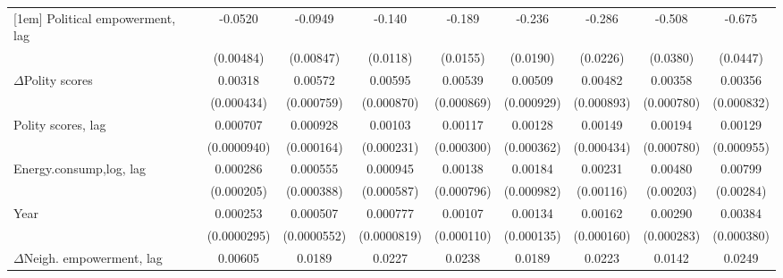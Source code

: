 \begin{table}[htbp]
\begin{tabular}{l*{8}{c}}
[1em]
Political empowerment, lag   &     -0.0520\sym{***}&     -0.0949\sym{***}&      -0.140\sym{***}&      -0.189\sym{***}&      -0.236\sym{***}&      -0.286\sym{***}&      -0.508\sym{***}&      -0.675\sym{***}\\
                    &   (0.00484)         &   (0.00847)         &    (0.0118)         &    (0.0155)         &    (0.0190)         &    (0.0226)         &    (0.0380)         &    (0.0447)         \\
[1em]
$\Delta$Polity scores            &     0.00318\sym{***}&     0.00572\sym{***}&     0.00595\sym{***}&     0.00539\sym{***}&     0.00509\sym{***}&     0.00482\sym{***}&     0.00358\sym{***}&     0.00356\sym{***}\\
                    &  (0.000434)         &  (0.000759)         &  (0.000870)         &  (0.000869)         &  (0.000929)         &  (0.000893)         &  (0.000780)         &  (0.000832)         \\
[1em]
Polity scores, lag            &    0.000707\sym{***}&    0.000928\sym{***}&     0.00103\sym{***}&     0.00117\sym{***}&     0.00128\sym{***}&     0.00149\sym{***}&     0.00194\sym{**} &     0.00129         \\
                    & (0.0000940)         &  (0.000164)         &  (0.000231)         &  (0.000300)         &  (0.000362)         &  (0.000434)         &  (0.000780)         &  (0.000955)         \\
[1em]
Energy.consump,log, lag            &    0.000286         &    0.000555         &    0.000945         &     0.00138\sym{*}  &     0.00184\sym{*}  &     0.00231\sym{**} &     0.00480\sym{**} &     0.00799\sym{***}\\
                    &  (0.000205)         &  (0.000388)         &  (0.000587)         &  (0.000796)         &  (0.000982)         &   (0.00116)         &   (0.00203)         &   (0.00284)         \\
[1em]
Year                &    0.000253\sym{***}&    0.000507\sym{***}&    0.000777\sym{***}&     0.00107\sym{***}&     0.00134\sym{***}&     0.00162\sym{***}&     0.00290\sym{***}&     0.00384\sym{***}\\
                    & (0.0000295)         & (0.0000552)         & (0.0000819)         &  (0.000110)         &  (0.000135)         &  (0.000160)         &  (0.000283)         &  (0.000380)         \\
[1em]
$\Delta$Neigh. empowerment, lag&     0.00605\sym{*}  &      0.0189\sym{***}&      0.0227\sym{***}&      0.0238\sym{***}&      0.0189\sym{**} &      0.0223\sym{**} &      0.0142         &      0.0249\sym{*}  \\

\end{tabular}
\end{table}
